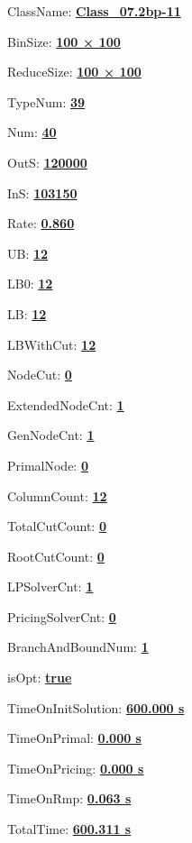 \documentclass[11pt]{article}
\begin{document}
\pagestyle{empty}


ClassName: \underline{\textbf{Class_07.2bp-11}}
\par
BinSize: \underline{\textbf{100 × 100}}
\par
ReduceSize: \underline{\textbf{100 × 100}}
\par
TypeNum: \underline{\textbf{39}}
\par
Num: \underline{\textbf{40}}
\par
OutS: \underline{\textbf{120000}}
\par
InS: \underline{\textbf{103150}}
\par
Rate: \underline{\textbf{0.860}}
\par
UB: \underline{\textbf{12}}
\par
LB0: \underline{\textbf{12}}
\par
LB: \underline{\textbf{12}}
\par
LBWithCut: \underline{\textbf{12}}
\par
NodeCut: \underline{\textbf{0}}
\par
ExtendedNodeCnt: \underline{\textbf{1}}
\par
GenNodeCnt: \underline{\textbf{1}}
\par
PrimalNode: \underline{\textbf{0}}
\par
ColumnCount: \underline{\textbf{12}}
\par
TotalCutCount: \underline{\textbf{0}}
\par
RootCutCount: \underline{\textbf{0}}
\par
LPSolverCnt: \underline{\textbf{1}}
\par
PricingSolverCnt: \underline{\textbf{0}}
\par
BranchAndBoundNum: \underline{\textbf{1}}
\par
isOpt: \underline{\textbf{true}}
\par
TimeOnInitSolution: \underline{\textbf{600.000 s}}
\par
TimeOnPrimal: \underline{\textbf{0.000 s}}
\par
TimeOnPricing: \underline{\textbf{0.000 s}}
\par
TimeOnRmp: \underline{\textbf{0.063 s}}
\par
TotalTime: \underline{\textbf{600.311 s}}
\par
\newpage


\end{document}
